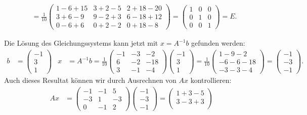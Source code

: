 \begin{loesung}
\begin{teilaufgaben}
\begin{align*}
{}
\\
&=
\frac1{10}
\begin{pmatrix}
1-6+15 & 3+2-5 & 2 +18 - 20\\
3+6-9  & 9 -2+3& 6-18+12\\
0-6+6  & 0+2-2&0+18-8
\end{pmatrix}
=\begin{pmatrix}
1&0&0\\
0&1&0\\
0&0&1
\end{pmatrix}=E.
\end{align*}
\item Die Lösung des Gleichungssystems kann jetzt mit $x=A^{-1}b$ gefunden
werden:
\begin{align*}
b&=
\begin{pmatrix}-1\\3\\1\end{pmatrix}
&
x&=A^{-1}b=
\frac1{10}
\begin{pmatrix}
-1&-3& -2\\
 6&-2&-18\\
 3&-1& -4
\end{pmatrix}
\begin{pmatrix}-1\\ 3\\ 1\end{pmatrix}
=
\frac1{10}
\begin{pmatrix}
 1-9-2\\
-6-6-18\\
-3-3-4
\end{pmatrix}
=
\begin{pmatrix}
-1\\
-3\\
-1
\end{pmatrix}.
\end{align*}
Auch dieses Resultat können wir durch Ausrechnen von $Ax$ kontrollieren:
\begin{align*}
Ax
&=
\begin{pmatrix}
  -1& -1&  5\\
  -3&  1& -3\\
   0& -1&  2
\end{pmatrix}
\begin{pmatrix}
-1\\-3\\-1
\end{pmatrix}
=
\begin{pmatrix}
1+3-5\\
3-3+3\\

\end{pmatrix}
\end{align*}
\end{teilaufgaben}
\end{loesung}
